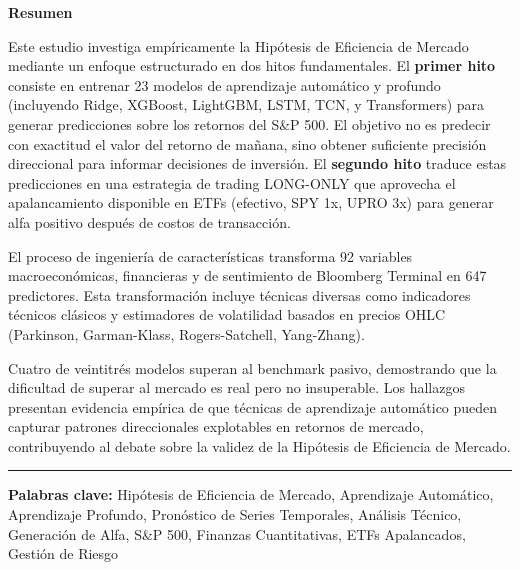 \documentclass[11pt,a4paper]{article}
\begin{document}
\begin{minipage}{0.95\textwidth}
\small
{}
\textbf{Resumen}

\vspace{0.3cm}

Este estudio investiga emp\'iricamente la Hip\'otesis de Eficiencia de Mercado mediante un enfoque estructurado en dos hitos fundamentales. El \textbf{primer hito} consiste en entrenar 23 modelos de aprendizaje autom\'atico y profundo (incluyendo Ridge, XGBoost, LightGBM, LSTM, TCN, y Transformers) para generar predicciones sobre los retornos del S\&P 500. El objetivo no es predecir con exactitud el valor del retorno de ma\~nana, sino obtener suficiente precisi\'on direccional para informar decisiones de inversi\'on. El \textbf{segundo hito} traduce estas predicciones en una estrategia de trading LONG-ONLY que aprovecha el apalancamiento disponible en ETFs (efectivo, SPY 1x, UPRO 3x) para generar alfa positivo despu\'es de costos de transacci\'on.

El proceso de ingenier\'ia de caracter\'isticas transforma 92 variables macroecon\'omicas, financieras y de sentimiento de Bloomberg Terminal en 647 predictores. Esta transformaci\'on incluye t\'ecnicas diversas como indicadores t\'ecnicos cl\'asicos y estimadores de volatilidad basados en precios OHLC (Parkinson, Garman-Klass, Rogers-Satchell, Yang-Zhang).

Cuatro de veintitr\'es modelos superan al benchmark pasivo, demostrando que la dificultad de superar al mercado es real pero no insuperable. Los hallazgos presentan evidencia emp\'irica de que t\'ecnicas de aprendizaje autom\'atico pueden capturar patrones direccionales explotables en retornos de mercado, contribuyendo al debate sobre la validez de la Hip\'otesis de Eficiencia de Mercado.

\end{minipage}

\vspace{0.8cm}

\begin{center}
\noindent\rule{0.9\textwidth}{0.5pt}
\end{center}

\newpage

\vspace*{0.5cm}

\textbf{Palabras clave:} Hip\'otesis de Eficiencia de Mercado, Aprendizaje Autom\'atico, Aprendizaje Profundo, Pron\'ostico de Series Temporales, An\'alisis T\'ecnico, Generaci\'on de Alfa, S\&P 500, Finanzas Cuantitativas, ETFs Apalancados, Gesti\'on de Riesgo
\end{document}

